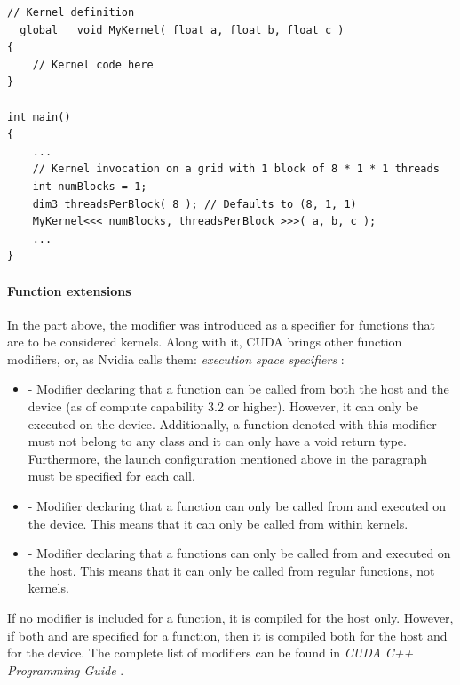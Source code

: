 \begin{lstlisting}[caption={Example of C++ pseudocode of a Kernel launch on a grid consisting of 1 one-dimensional block that is made up of 8 threads. Taken from Nvidia's \emph{CUDA C++ Programming Guide} \cite{NVIDIAMay2022}.},label={Listing:CUDA-kernel-example}]
// Kernel definition
__global__ void MyKernel( float a, float b, float c )
{
	// Kernel code here
}

int main()
{
	...
	// Kernel invocation on a grid with 1 block of 8 * 1 * 1 threads
	int numBlocks = 1;
	dim3 threadsPerBlock( 8 ); // Defaults to (8, 1, 1)
	MyKernel<<< numBlocks, threadsPerBlock >>>( a, b, c );
	...
}
\end{lstlisting}

\paragraph{Function extensions}\label{Paragraph:CUDA-C++-extensions-outer-kernel-extensions-function-extensions}
In the part above, the  modifier was introduced as a specifier for functions that are to be considered kernels. Along with it, CUDA brings other function modifiers, or, as Nvidia calls them: \textit{execution space specifiers} \cite{NVIDIAMay2022}:

\begin{itemize}
	\item {} - Modifier declaring that a function can be called from both the host and the device (as of compute capability 3.2 or higher). However, it can only be executed on the device. Additionally, a function denoted with this modifier must not belong to any class and it can only have a void return type. Furthermore, the launch configuration mentioned above in the \textit{} paragraph must be specified for each call.
	\item {} - Modifier declaring that a function can only be called from and executed on the device. This means that it can only be called from within kernels.
	\item {} - Modifier declaring that a functions can only be called from and executed on the host. This means that it can only be called from regular functions, not kernels.
\end{itemize}

If no modifier is included for a function, it is compiled for the host only. However, if both  and  are specified for a function, then it is compiled both for the host and for the device. The complete list of modifiers can be found in \emph{CUDA C++ Programming Guide} \cite{NVIDIAMay2022}.

